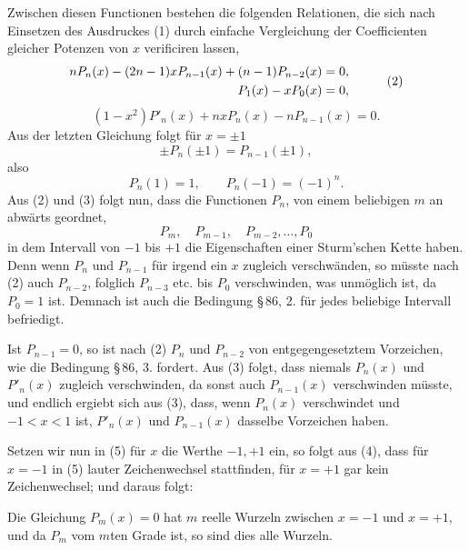 \documentclass[11pt]{article}
\begin{document}
Zwischen diesen Functionen bestehen die folgenden Relationen, die sich nach Einsetzen des Ausdruckes (1) durch einfache Vergleichung der Coefficienten gleicher Potenzen von $x$ verificiren lassen,
\begin{equation}
\begin{aligned}
        nP_n(x)-(2n-1)xP_{n-1}(x)+(n-1)P_{n-2}(x)&=0,\cr
        P_1(x)-xP_0(x)&=0,
\end{aligned}
\tag{2}
\end{equation}
\begin{equation}
        (1-x^2)P'_n(x)+nxP_n(x)-nP_{n-1}(x)=0.
\tag{3}
\end{equation}
Aus der letzten Gleichung folgt f\"ur $x=\pm1$
\[
        \pm P_n(\pm1)=P_{n-1}(\pm1),
\]
also
\begin{equation}
        P_n(1)=1,
        \qquad P_n(-1)=(-1)^n.
\tag{4}
\end{equation}
Aus (2) und (3) folgt nun, dass die Functionen $P_n$, von einem beliebigen $m$ an abw\"arts geordnet,
\begin{equation}
        P_m,
        \quad P_{m-1},
        \quad P_{m-2},
        \ldots,
        P_0
\tag{5}
\end{equation}
in dem Intervall von $-1$ bis $+1$ die Eigenschaften einer Sturm'schen Kette haben. Denn wenn $P_n$ und $P_{n-1}$ f\"ur irgend ein $x$ zugleich verschw\"anden, so m\"usste nach (2) auch $P_{n-2}$, folglich $P_{n-3}$ etc. bis $P_0$ verschwinden, was unm\"oglich ist, da $P_0=1$ ist. Demnach ist auch die Bedingung \S\,86, 2. f\"ur jedes beliebige Intervall befriedigt.

Ist $P_{n-1}=0$, so ist nach (2) $P_n$ und $P_{n-2}$ von entgegengesetztem Vorzeichen, wie die Bedingung \S\,86, 3. fordert. Aus (3) folgt, dass niemals $P_n(x)$ und $P'_n(x)$ zugleich verschwinden, da sonst auch $P_{n-1}(x)$ verschwinden m\"usste, und endlich ergiebt sich aus (3), dass, wenn $P_n(x)$ verschwindet und $-1<x<1$ ist, $P'_n(x)$ und $P_{n-1}(x)$ dasselbe Vorzeichen haben.

Setzen wir nun in (5) f\"ur $x$ die Werthe $-1,+1$ ein, so folgt aus (4), dass f\"ur $x=-1$ in (5) lauter Zeichenwechsel stattfinden, f\"ur $x=+1$ gar kein Zeichenwechsel; und daraus folgt:

Die Gleichung $P_m(x)=0$ hat $m$ reelle Wurzeln zwischen $x=-1$ und $x=+1$, und da $P_m$ vom $m$ten Grade ist, so sind dies alle Wurzeln.
\end{document}
